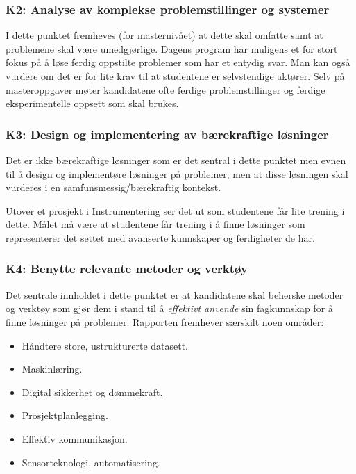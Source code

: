 \subsubsection{K2: Analyse av komplekse problemstillinger og systemer}

I dette punktet fremheves (for masternivået) at dette skal omfatte  samt at problemene skal være umedgjørlige. Dagens program har muligens et for stort fokus på å løse ferdig oppstilte problemer som har et entydig svar. Man kan også vurdere om det er for lite krav til at studentene er selvstendige aktører. Selv på masteroppgaver møter kandidatene ofte ferdige problemstillinger og ferdige eksperimentelle oppsett som skal brukes. 

\subsubsection{K3: Design og implementering av bærekraftige løsninger}

Det er ikke bærekraftige løsninger som er det sentral i dette punktet men evnen til å design og implementøre løsninger på problemer; men at disse løsningen skal vurderes i en samfunsmessig/bærekraftig kontekst. 

Utover et prosjekt i Instrumentering ser det ut som studentene får lite trening i dette. Målet må være at studentene får trening i å finne løsninger som representerer det settet med avanserte kunnskaper og ferdigheter de har.

\subsubsection{K4: Benytte relevante metoder og verktøy}
Det sentrale innholdet i dette punktet er at kandidatene skal beherske metoder og verktøy som gjør dem i stand til å \emph{effektivt anvende} sin fagkunnskap for å finne løsninger på problemer. Rapporten fremhever særskilt noen områder:

\begin{itemize}
	\item Håndtere store, ustrukturerte datasett.
	\item Maskinlæring.
	\item Digital sikkerhet og dømmekraft.
	\item Prosjektplanlegging.
	\item Effektiv kommunikasjon.
	\item Sensorteknologi, automatisering.
\end{itemize}

